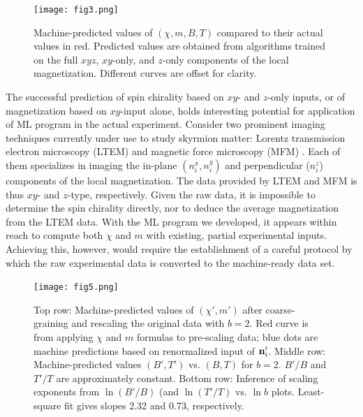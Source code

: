 \documentclass[reprint,amsmath,amssymb,aps,showpacs,superscriptaddress,prl]{revtex4-1}
\renewcommand{\v}[1]{{\bf #1}}
\begin{document}
\begin{figure}[h]
\texttt{[image: fig3.png]}
\caption{Machine-predicted values of $(\chi, m, B, T)$ compared to their actual values in red. Predicted values are obtained from algorithms trained on the full $xyz$, $xy$-only, and $z$-only components of the local magnetization. Different curves are offset for clarity.}\label{fig:3}
\end{figure}

The successful prediction of spin chirality based on $xy$- and $z$-only inputs, or of magnetization based on $xy$-input alone, holds interesting potential for application of ML program in the actual experiment. 
Consider two prominent imaging techniques currently under use to study skyrmion matter: Lorentz transmission electron microscopy (LTEM) \cite{tokura10} and magnetic force microscopy (MFM) \cite{pana17}. Each of them specializes in imaging the in-plane $(n^x_i , n^y_i )$ and perpendicular ($n^z_i$) components of the local magnetization. The data provided by LTEM and MFM is thus $xy$- and $z$-type, respectively.  Given the raw data, it is impossible to determine the spin chirality directly, nor to deduce the average magnetization from the LTEM data. With the ML program we developed, it appears within reach to compute both $\chi$ and $m$ with existing, partial experimental inputs. Achieving this, however, would require the establishment of a careful protocol by which the raw experimental data is converted to the machine-ready data set. 

\begin{figure}[t]
\texttt{[image: fig5.png]}
\caption{Top row: Machine-predicted values of $(\chi', m' )$ after coarse-graining and rescaling the original data with $b=2$. Red curve is from applying $\chi$ and $m$ formulas to pre-scaling data; blue dots are machine predictions based on renormalized input of $\v n'_i$. Middle row: Machine-predicted values $(B', T')$ vs. $(B, T)$ for $b=2$. $B'/B$ and $T'/T$ are approximately constant. Bottom row: Inference of scaling exponents from $\ln (B'/B )$ (and $\ln (T' /T)$ vs. $\ln b$ plots. Least-square fit gives slopes 2.32 and 0.73, respectively. } \label{fig:5}
\end{figure}
\end{document}
